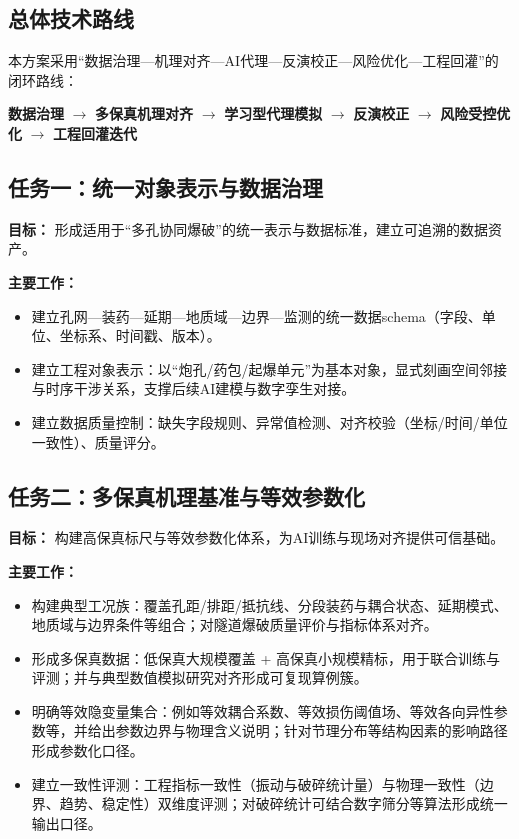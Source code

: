 \documentclass[12pt,a4paper,fontset=mac]{ctexart}
\newcommand{\AI}{\textsc{AI}}
\begin{document}
\subsection{总体技术路线}
本方案采用“数据治理—机理对齐—\AI{}代理—反演校正—风险优化—工程回灌”的闭环路线：
\begin{center}
\textbf{数据治理} $\rightarrow$
\textbf{多保真机理对齐} $\rightarrow$
\textbf{学习型代理模拟} $\rightarrow$
\textbf{反演校正} $\rightarrow$
\textbf{风险受控优化} $\rightarrow$
\textbf{工程回灌迭代}
\end{center}

\subsection{任务一：统一对象表示与数据治理}
\textbf{目标：} 形成适用于“多孔协同爆破”的统一表示与数据标准，建立可追溯的数据资产。

\textbf{主要工作：}
\begin{itemize}
  \item 建立孔网—装药—延期—地质域—边界—监测的统一数据schema（字段、单位、坐标系、时间戳、版本）。
  \item 建立工程对象表示：以“炮孔/药包/起爆单元”为基本对象，显式刻画空间邻接与时序干涉关系，支撑后续\AI{}建模与数字孪生对接\cite{Li2024TunnelDT,Salzgeber2024FromDigitalModelToDT}。
  \item 建立数据质量控制：缺失字段规则、异常值检测、对齐校验（坐标/时间/单位一致性）、质量评分。
\end{itemize}

\subsection{任务二：多保真机理基准与等效参数化}
\textbf{目标：} 构建高保真标尺与等效参数化体系，为\AI{}训练与现场对齐提供可信基础。

\textbf{主要工作：}
\begin{itemize}
  \item 构建典型工况族：覆盖孔距/排距/抵抗线、分段装药与耦合状态、延期模式、地质域与边界条件等组合；对隧道爆破质量评价与指标体系对齐\cite{Shi2024TunnelBlastingReview}。
  \item 形成多保真数据：低保真大规模覆盖 + 高保真小规模精标，用于联合训练与评测；并与典型数值模拟研究对齐形成可复现算例簇\cite{Rong2024InSituJointBlasting,Sun2025BifurcatedTunnelBlasting,Guan2024NonCutBlastScheme,Men2025WaterInrushFEMSPH}。
  \item 明确等效隐变量集合：例如等效耦合系数、等效损伤阈值场、等效各向异性参数等，并给出参数边界与物理含义说明；针对节理分布等结构因素的影响路径形成参数化口径\cite{Li2025JointDistributionTunnel}。
  \item 建立一致性评测：工程指标一致性（振动与破碎统计量）与物理一致性（边界、趋势、稳定性）双维度评测；对破碎统计可结合数字筛分等算法形成统一输出口径\cite{Song2025DigitalSievingFragmentation}。
\end{itemize}
\end{document}

